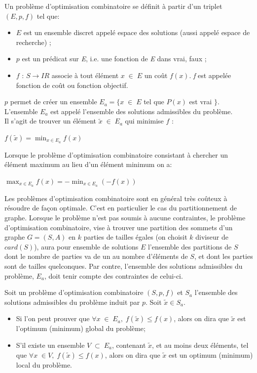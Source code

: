 \begin{definition}
	Un problème d'optimisation combinatoire se définit à partir d'un triplet $(E, p, f)$ tel que:
\begin{itemize}	
	\item $E$ est un ensemble discret appelé espace des solutions (aussi appelé espace de recherche) ;
	\item $p$ est un prédicat sur \emph{E}, i.e. une fonction de \emph{E} dans {vrai, faux} ;
	\item $f$ : $S \rightarrow IR$ associe à tout élément $x \;\in\; E$ un coût $f(x)$. \emph{f} est appelée fonction  de coût ou fonction objectif.
	\end{itemize}
	$p$ permet de créer un ensemble $E_a = \{x\;\in\; E$ tel que $P(x)$ est vrai $\}$. L'ensemble $E_a$ est appelé l'ensemble des solutions admissibles du problème.\\
	Il s'agit de trouver un élément $\tilde{x} \;\in\; E_a$ qui minimise $f$ :
	\begin{center}
	$\displaystyle f(\tilde{x}) = \min_{x\in E_a}f(x)$
	\end{center}
	Lorsque le problème d'optimisation combinatoire consistant à chercher un élément maximum au
lieu d'un élément minimum on a:
\begin{center}
	$\displaystyle \max_{x\in E_a}f(x) = -\min_{x\in E_a}(-f(x))$
	\end{center}
\end{definition}
	Les problèmes d'optimisation combinatoire sont en général très coûteux à résoudre de façon optimale. C'est en particulier le cas du partitionnement de graphe.
Lorsque le problème n'est pas soumis à aucune contraintes, le problème d'optimisation combinatoire, vise à trouver une partition des sommets d'un graphe $G = (S, A)$ en $k$ parties de tailles égales (on choisit $k$ diviseur de $card(S)$), aura pour ensemble de solutions $E$ l'ensemble des partitions de $S$ dont le nombre de parties va de un au nombre d'éléments de $S$, et dont les parties sont de tailles quelconques. Par contre, l'ensemble des solutions admissibles du problème, $E_a$, doit tenir compte des contraintes de celui-ci.

\begin{definition}
	Soit un problème d'optimisation combinatoire $(S, p, f)$ et $S_a$ l'ensemble des solutions admissibles du problème induit par $p$. Soit $\tilde{x} \in S_a$.
	\begin{itemize}
	\item Si l'on peut prouver que $\forall x \;\in\; E_a,\; f(\tilde{x})\leq f(x)$, alors on dira que $\tilde{x}$ est l'optimum (minimum) global du problème;
	\item S'il existe un ensemble $V\; \subset\; E_a$, contenant $\tilde{x}$, et au moins deux éléments, tel que $\forall x\;\in V,\; f(\tilde{x}) \leq f(x)$, alors on dira que $\tilde{x}$ est un optimum (minimum) local du problème.
	\end{itemize}
\end{definition}	
	
